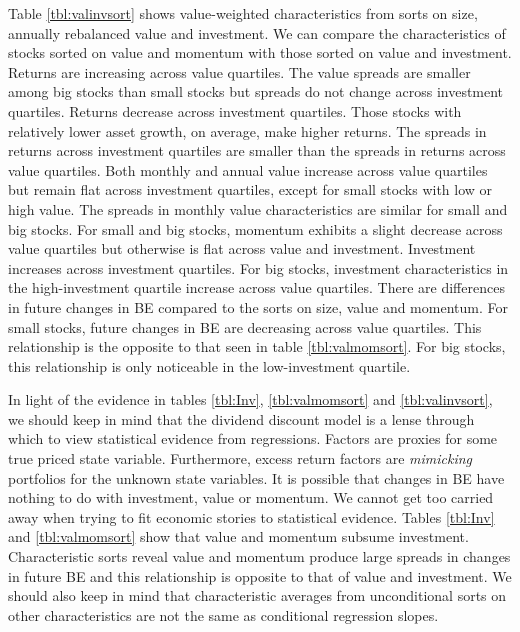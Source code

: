 Table \ref{tbl:valinvsort} shows value-weighted characteristics from sorts on size,
annually rebalanced value and investment. We can compare the characteristics of stocks
sorted on value and momentum with those sorted on value and investment. Returns are
increasing across value quartiles. The value spreads are smaller among big stocks than
small stocks but spreads do not change across investment quartiles. Returns decrease
across investment quartiles. Those stocks with relatively lower asset growth, on average,
make higher returns. The spreads in returns across investment quartiles are smaller than
the spreads in returns across value quartiles. Both monthly and annual value increase
across value quartiles but remain flat across investment quartiles, except for small
stocks with low or high value. The spreads in monthly value characteristics are similar
for small and big stocks. For small and big stocks, momentum exhibits a slight decrease
across value quartiles but otherwise is flat across value and investment. Investment
increases across investment quartiles. For big stocks, investment characteristics in the
high-investment quartile increase across value quartiles. There are differences in future
changes in BE compared to the sorts on size, value and momentum. For small stocks, future
changes in BE are decreasing across value quartiles. This relationship is the opposite to
that seen in table \ref{tbl:valmomsort}. For big stocks, this relationship is only
noticeable in the low-investment quartile.

In light of the evidence in tables \ref{tbl:Inv}, \ref{tbl:valmomsort} and
\ref{tbl:valinvsort}, we should keep in mind that the dividend discount model is a lense
through which to view statistical evidence from regressions. Factors are proxies for some
true priced state variable. Furthermore, excess return factors are \emph{mimicking}
portfolios for the unknown state variables. It is possible that changes in BE have nothing
to do with investment, value or momentum. We cannot get too carried away when trying to
fit economic stories to statistical evidence. Tables \ref{tbl:Inv} and
\ref{tbl:valmomsort} show that value and momentum subsume investment. Characteristic sorts
reveal value and momentum produce large spreads in changes in future BE and this
relationship is opposite to that of value and investment. We should also keep in mind that
characteristic averages from unconditional sorts on other characteristics are not the
same as conditional regression slopes.
